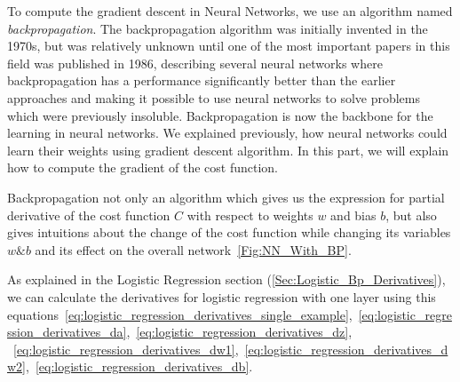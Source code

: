 To compute the gradient descent in Neural Networks, we use an algorithm named \textit{backpropagation}. The backpropagation algorithm was initially invented in the 1970s, but was relatively unknown until one of the most important papers in this field was published in 1986, describing several neural networks where backpropagation has a performance significantly better than the earlier approaches and making it possible to use neural networks to solve problems which were previously insoluble. Backpropagation is now the backbone for the learning in neural networks.
We explained previously, how neural networks could learn their weights using gradient descent algorithm. In this part, we will explain how to compute the gradient of the cost function.

Backpropagation not only an algorithm which gives us the expression for partial derivative of the cost function $C$ with respect to weights $w$ and bias $b$, but also gives  intuitions about the change of the cost function while changing its variables $w \& b$ and its effect on the overall network~\ref{Fig:NN_With_BP}.

As explained in the Logistic Regression section (\ref{Sec:Logistic_Bp_Derivatives}), we can calculate the derivatives for logistic regression with one layer using this equations~\eqref{eq:logistic_regression_derivatives_single_example},~\eqref{eq:logistic_regression_derivatives_da},~\eqref{eq:logistic_regression_derivatives_dz},\\
~\eqref{eq:logistic_regression_derivatives_dw1},~\eqref{eq:logistic_regression_derivatives_dw2},~\eqref{eq:logistic_regression_derivatives_db}.\\

